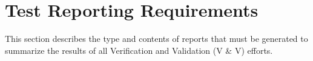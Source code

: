 \section{Test Reporting Requirements}\label{testplan_reporting}
This section describes the type and contents of reports that must be generated
to summarize the results of all Verification and Validation (V \& V) efforts.



\clearpage



\clearpage



\clearpage


